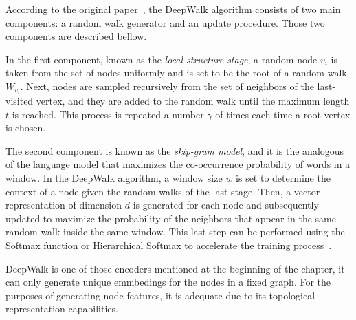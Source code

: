 According to the original paper~\cite{deepwalk}, the DeepWalk algorithm consists of two main components: a random walk generator and an update procedure. Those two components are described bellow.

In the first component, known as the \textit{local structure stage}, a random node $v_i$ is taken from the set of nodes uniformly and is set to be the root of a random walk $W_{v_i}$. Next, nodes are sampled recursively from the set of neighbors of the last-visited vertex, and they are added to the random walk until the maximum length $t$ is reached. This process is repeated a number $\gamma$ of times each time a root vertex is chosen.

The second component is known as the \textit{skip-gram model}, and it is the analogous of the language model that maximizes the co-occurrence probability of words in a window. In the DeepWalk algorithm, a window size $w$ is set to determine the context of a node given the random walks of the last stage. Then, a vector representation of dimension $d$ is generated for each node and subsequently updated to maximize the probability of the neighbors that appear in the same random walk inside the same window. This last step can be performed using the Softmax function or Hierarchical Softmax to accelerate the training process~\cite{deepwalk}. 

DeepWalk is one of those encoders mentioned at the beginning of the chapter, it can only generate unique emmbedings for the nodes in a fixed graph. For the purposes of generating  node features, it is adequate due to its topological representation capabilities.

